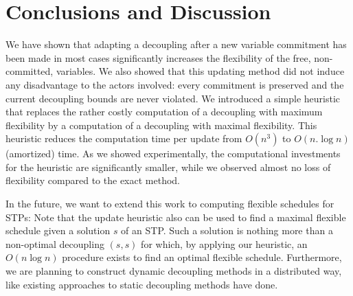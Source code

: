 \section{Conclusions and Discussion}

We have shown that adapting a decoupling after a new variable commitment has been
made in most cases significantly increases the flexibility of the free, non-committed, variables.
We also showed that this updating method did not induce any disadvantage to the actors involved: every commitment
is preserved and the current decoupling bounds are never violated.
We introduced a simple heuristic that replaces the rather costly computation of a decoupling with maximum flexibility by a computation of a decoupling with maximal flexibility. This heuristic reduces the computation time per update from $O(n^3)$ to $O(n.\log n)$ (amortized) time.
As we showed experimentally, the computational investments for the heuristic are significantly smaller, while we observed almost no loss of flexibility compared to the exact method.

In the future, we want to extend this work to computing flexible schedules for STPs: Note that the update heuristic 
also can be used to find a maximal flexible schedule given a solution $s$ of an STP. Such a solution is nothing more than
a non-optimal decoupling $(s,s)$ for which, by applying our heuristic, an $O(n \log n)$ procedure exists to find an optimal
flexible schedule. Furthermore, we are planning to construct dynamic decoupling methods in a distributed way, like existing approaches to static decoupling methods have done.